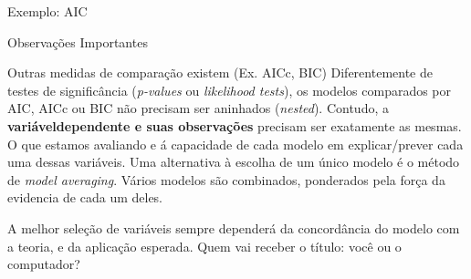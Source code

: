 \documentclass{beamer}\usepackage[]{graphicx}\usepackage[]{color}
\makeatletter
\newcommand{\hlopt}[1]{\textcolor[rgb]{0,0,0}{#1}}%
\newcommand{\hlstd}[1]{\textcolor[rgb]{0.345,0.345,0.345}{#1}}%
\newcommand{\hlkwb}[1]{\textcolor[rgb]{0.69,0.353,0.396}{#1}}%
\newcommand{\hlkwc}[1]{\textcolor[rgb]{0.333,0.667,0.333}{#1}}%
\newcommand{\hlkwd}[1]{\textcolor[rgb]{0.737,0.353,0.396}{\textbf{#1}}}%
\newenvironment{kframe}{%
 \def\at@end@of@kframe{}%
 \ifinner\ifhmode%
  \def\at@end@of@kframe{\end{minipage}}%
  \begin{minipage}{\columnwidth}%
 \fi\fi%
 \def\FrameCommand##1{\hskip\@totalleftmargin \hskip-\fboxsep
 \colorbox{shadecolor}{##1}\hskip-\fboxsep
     \hskip-\linewidth \hskip-\@totalleftmargin \hskip\columnwidth}%
 \MakeFramed {\advance\hsize-\width
   \@totalleftmargin\z@ \linewidth\hsize
   \@setminipage}}%
 {\par\unskip\endMakeFramed%
 \at@end@of@kframe}
\newenvironment{knitrout}{}{} %
\renewenvironment{knitrout}{\setlength{\topsep}{0mm}}{}
\makeatother
\begin{document}
\begin{frame}[fragile]{Exemplo: AIC}

\end{frame}



\begin{frame}{Observações Importantes}
\begin{small}

Outras medidas de comparação existem (Ex. AICc, BIC)
\vfill
Diferentemente de testes de significância (\emph{p-values} ou \emph{likelihood tests}), os modelos comparados por AIC, AICc ou BIC não precisam ser aninhados (\emph{nested}).
\vfill
Contudo, a  \textbf{variáveldependente e suas observações} precisam ser exatamente as mesmas. O que estamos avaliando e á capacidade de cada modelo em explicar/prever cada uma dessas variáveis.
\vfill
Uma alternativa à escolha de um único modelo é o método de \emph{model averaging}. Vários modelos são combinados, ponderados pela força da evidencia de cada um deles. \pause

A melhor seleção de variáveis sempre dependerá da concordância do modelo com a teoria, e da aplicação esperada. 
\vfill
Quem vai receber o título: você ou o computador?

\end{small}
\end{frame}
\end{document}
